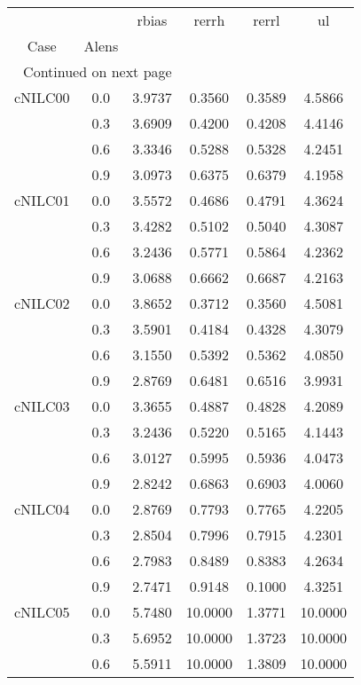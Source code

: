 \begin{longtable}{cccccc}
\toprule
        &     &   rbias &   rerrh &  rerrl &      ul \\
Case & Alens &         &         &        &         \\
\midrule
\endhead
\midrule
\multicolumn{3}{r}{{Continued on next page}} \\
\midrule
\endfoot

\bottomrule
\endlastfoot
cNILC00 & 0.0 & 3.9737 & 0.3560 & 0.3589 & 4.5866 \\
        & 0.3 & 3.6909 & 0.4200 & 0.4208 & 4.4146 \\
        & 0.6 & 3.3346 & 0.5288 & 0.5328 & 4.2451 \\
        & 0.9 & 3.0973 & 0.6375 & 0.6379 & 4.1958 \\
cNILC01 & 0.0 & 3.5572 & 0.4686 & 0.4791 & 4.3624 \\
        & 0.3 & 3.4282 & 0.5102 & 0.5040 & 4.3087 \\
        & 0.6 & 3.2436 & 0.5771 & 0.5864 & 4.2362 \\
        & 0.9 & 3.0688 & 0.6662 & 0.6687 & 4.2163 \\
cNILC02 & 0.0 & 3.8652 & 0.3712 & 0.3560 & 4.5081 \\
        & 0.3 & 3.5901 & 0.4184 & 0.4328 & 4.3079 \\
        & 0.6 & 3.1550 & 0.5392 & 0.5362 & 4.0850 \\
        & 0.9 & 2.8769 & 0.6481 & 0.6516 & 3.9931 \\
cNILC03 & 0.0 & 3.3655 & 0.4887 & 0.4828 & 4.2089 \\
        & 0.3 & 3.2436 & 0.5220 & 0.5165 & 4.1443 \\
        & 0.6 & 3.0127 & 0.5995 & 0.5936 & 4.0473 \\
        & 0.9 & 2.8242 & 0.6863 & 0.6903 & 4.0060 \\
cNILC04 & 0.0 & 2.8769 & 0.7793 & 0.7765 & 4.2205 \\
        & 0.3 & 2.8504 & 0.7996 & 0.7915 & 4.2301 \\
        & 0.6 & 2.7983 & 0.8489 & 0.8383 & 4.2634 \\
        & 0.9 & 2.7471 & 0.9148 & 0.1000 & 4.3251 \\
cNILC05 & 0.0 & 5.7480 & 10.0000 & 1.3771 & 10.0000 \\
        & 0.3 & 5.6952 & 10.0000 & 1.3723 & 10.0000 \\
        & 0.6 & 5.5911 & 10.0000 & 1.3809 & 10.0000 \\

\end{longtable}
